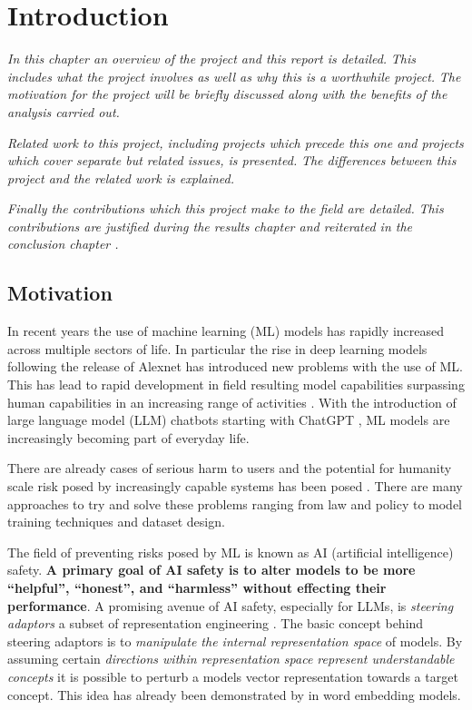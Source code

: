 \chapter{Introduction}
\label{ch:introduction}

\emph{In this chapter an overview of the project and this report is detailed.}
\emph{This includes what the project involves as well as why this is a worthwhile project.}
\emph{The motivation for the project will be briefly discussed along with the benefits of the analysis carried out.}

\emph{Related work to this project, including projects which precede this one and projects which cover separate but related issues, is presented.}
\emph{The differences between this project and the related work is explained.}

\emph{Finally the contributions which this project make to the field are detailed.}
\emph{This contributions are justified during the results chapter  and reiterated in the conclusion chapter .}

\section{Motivation}

In recent years the use of machine learning (ML) models has rapidly increased across multiple sectors of life.
In particular the rise in deep learning models following the release of Alexnet \citep{alexnet} has introduced new problems with the use of ML.
This has lead to rapid development in field resulting  model capabilities surpassing human capabilities in an increasing range of activities \citep{dynabench, gpt-5, grok-4, hle}.
With the introduction of large language model (LLM) chatbots starting with ChatGPT \citep{chatgpt}, ML models are increasingly becoming part of everyday life.

There are already cases of serious harm to users \citep{c.ai, psychosis} and the potential for humanity scale risk posed by increasingly capable systems has been posed \citep{survellience, deepfakes, disempowerment}.
There are many approaches to try and solve these problems ranging from law and policy to model training techniques and dataset design.

The field of preventing risks posed by ML is known as AI (artificial intelligence) safety.
\textbf{A primary goal of AI safety is to alter models to be more ``helpful'', ``honest'', and ``harmless'' without effecting their performance}.
A promising avenue of AI safety, especially for LLMs, is \emph{steering adaptors} a subset of representation engineering \citep{steering-taxonomy}.
The basic concept behind steering adaptors is to \emph{manipulate the internal representation space} of models.
By assuming certain \emph{directions within representation space represent understandable concepts} it is possible to perturb a models vector representation towards a target concept.
This idea has already been demonstrated by \citet{word2vec} in word embedding models.

